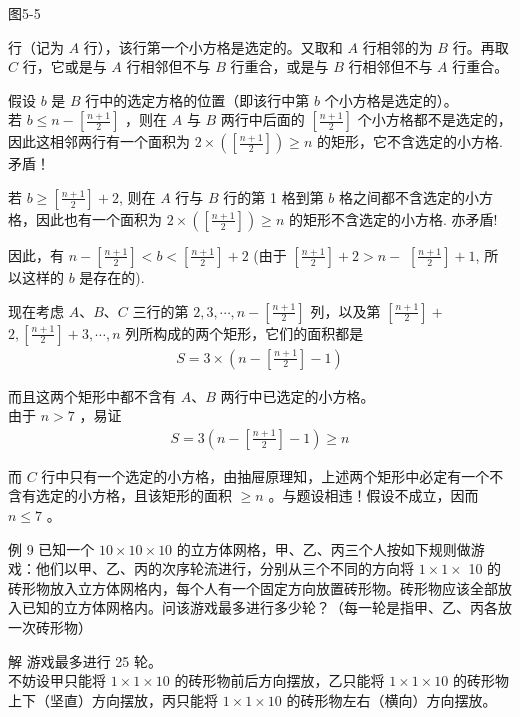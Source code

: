 \documentclass[10pt]{article}
\begin{document}
图5-5

行（记为 $A$ 行），该行第一个小方格是选定的。又取和 $A$ 行相邻的为 $B$ 行。再取 $C$ 行，它或是与 $A$ 行相邻但不与 $B$ 行重合，或是与 $B$ 行相邻但不与 $A$ 行重合。

假设 $b$ 是 $B$ 行中的选定方格的位置（即该行中第 $b$ 个小方格是选定的）。\\
若 $b \leqslant n-\left[\frac{n+1}{2}\right]$ ，则在 $A$ 与 $B$ 两行中后面的 $\left[\frac{n+1}{2}\right]$ 个小方格都不是选定的，因此这相邻两行有一个面积为 $2 \times\left(\left[\frac{n+1}{2}\right]\right) \geqslant n$ 的矩形，它不含选定的小方格. 矛盾！

若 $b \geqslant\left[\frac{n+1}{2}\right]+2$, 则在 $A$ 行与 $B$ 行的第 1 格到第 $b$ 格之间都不含选定的小方格，因此也有一个面积为 $2 \times\left(\left[\frac{n+1}{2}\right]\right) \geqslant n$ 的矩形不含选定的小方格. 亦矛盾!

因此，有 $n-\left[\frac{n+1}{2}\right]<b<\left[\frac{n+1}{2}\right]+2$ (由于 $\left[\frac{n+1}{2}\right]+2>n-$ $\left[\frac{n+1}{2}\right]+1$, 所以这样的 $b$ 是存在的).

现在考虑 $A 、 B 、 C$ 三行的第 $2,3, \cdots, n-\left[\frac{n+1}{2}\right]$ 列，以及第 $\left[\frac{n+1}{2}\right]+$\\
$2,\left[\frac{n+1}{2}\right]+3, \cdots, n$ 列所构成的两个矩形，它们的面积都是\\
\begin{align*}
S=3 \times\left(n-\left[\frac{n+1}{2}\right]-1\right)
\end{align*}

而且这两个矩形中都不含有 $A 、 B$ 两行中已选定的小方格。\\
由于 $n>7$ ，易证\\
\begin{align*}
S=3\left(n-\left[\frac{n+1}{2}\right]-1\right) \geqslant n
\end{align*}

而 $C$ 行中只有一个选定的小方格，由抽屉原理知，上述两个矩形中必定有一个不含有选定的小方格，且该矩形的面积 $\geqslant n$ 。与题设相违！假设不成立，因而 $n \leqslant 7$ 。

例 9 已知一个 $10 \times 10 \times 10$ 的立方体网格，甲、乙、丙三个人按如下规则做游戏：他们以甲、乙、丙的次序轮流进行，分别从三个不同的方向将 $1 \times 1 \times$ 10 的砖形物放入立方体网格内，每个人有一个固定方向放置砖形物。砖形物应该全部放入已知的立方体网格内。问该游戏最多进行多少轮？（每一轮是指甲、乙、丙各放一次砖形物）

解 游戏最多进行 25 轮。\\
不妨设甲只能将 $1 \times 1 \times 10$ 的砖形物前后方向摆放，乙只能将 $1 \times 1 \times 10$ 的砖形物上下（坚直）方向摆放，丙只能将 $1 \times 1 \times 10$ 的砖形物左右（横向）方向摆放。
\end{document}
